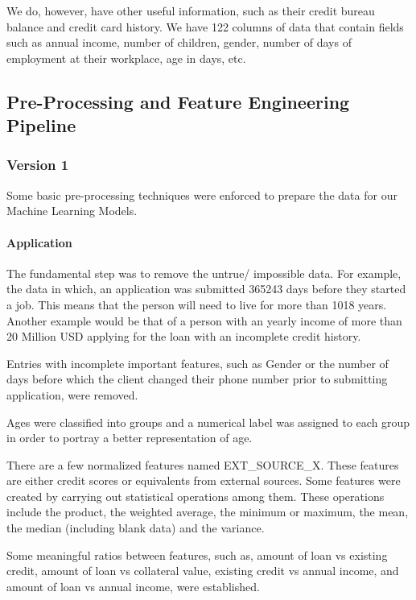 \documentclass[sigconf, nonacm]{acmart}
\begin{document}
We do, however, have other useful information, such as their credit bureau balance and credit card history. We have 122 columns of data that contain fields such as annual income, number of children, gender, number of days of employment at their workplace, age in days, etc.


\subsection{Pre-Processing and Feature Engineering Pipeline} \label{subsec:feat_eng}

\subsubsection{Version 1} \label{data:v1}
Some basic pre-processing techniques were enforced to prepare the data for our Machine Learning Models.

\paragraph{Application}

The fundamental step was to remove the untrue/ impossible data. For example, the data in which, an application was submitted 365243 days before they started a job. This means that the person will need to live for more than 1018 years. Another example would be that of a person with an yearly income of more than 20 Million USD applying for the loan with an incomplete credit history.

Entries with incomplete important features, such as Gender or the number of days before which the client changed their phone number prior to submitting application, were removed.

Ages were classified into groups and a numerical label was assigned to each group in order to portray a better representation of age.

There are a few normalized features named EXT\_SOURCE\_X. These features are either credit scores or equivalents from external sources. Some features were created by carrying out statistical operations among them. These operations include the product, the weighted average, the minimum or maximum, the mean, the median (including blank data) and the variance.

Some meaningful ratios between features, such as, amount of loan vs existing credit, amount of loan vs collateral value, existing credit vs annual income, and amount of loan vs annual income, were established.
\end{document}
